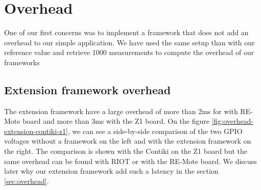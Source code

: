 \section{Overhead}

One of our first concerns was to implement a framework that does not add an overhead to our simple application.
We have used the same setup than with our reference value and retrieve 1000 measurements to compute the overhead of our frameworks

\subsection{Extension framework overhead}

The extension framework have a large overhead of more than 2ms for with RE-Mote board and more than 3ms with the Z1 board.
On the figure \ref{fig:overhead-extension-contiki-z1}, we can see a side-by-side comparison of the two GPIO voltages without a framework on the left and with the extension framework on the right.
The comparison is shown with the Contiki on the Z1 board but the same overhead can be found with RIOT or with the RE-Mote board.
We discuss later why our extension framework add such a latency in the section \ref{sec:overhead}.


